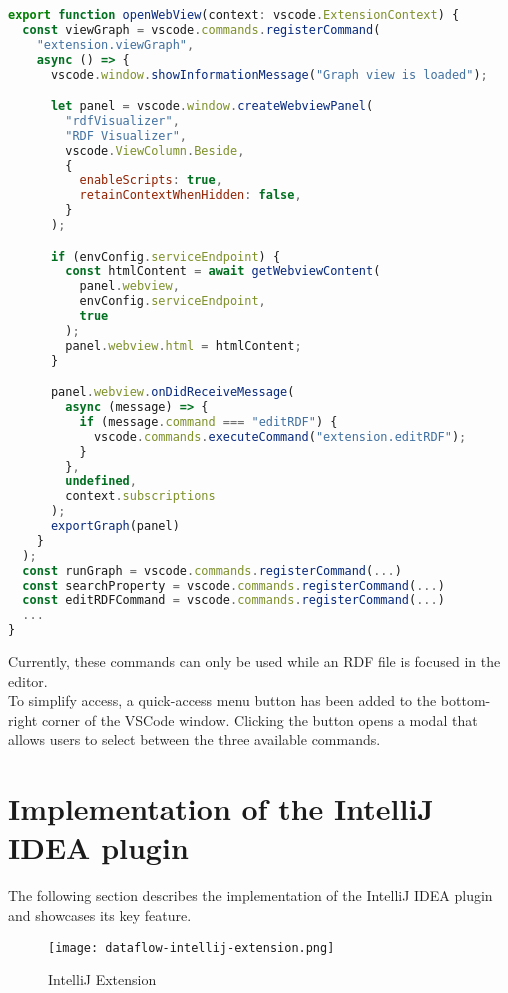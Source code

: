 \begin{lstlisting}[caption={openWebView}, label={lst:open-web-view}, language=JavaScript]
export function openWebView(context: vscode.ExtensionContext) {
  const viewGraph = vscode.commands.registerCommand(
    "extension.viewGraph",
    async () => {
      vscode.window.showInformationMessage("Graph view is loaded");

      let panel = vscode.window.createWebviewPanel(
        "rdfVisualizer",
        "RDF Visualizer",
        vscode.ViewColumn.Beside,
        {
          enableScripts: true,
          retainContextWhenHidden: false,
        }
      );

      if (envConfig.serviceEndpoint) {
        const htmlContent = await getWebviewContent(
          panel.webview,
          envConfig.serviceEndpoint,
          true
        );
        panel.webview.html = htmlContent;
      }

      panel.webview.onDidReceiveMessage(
        async (message) => {
          if (message.command === "editRDF") {
            vscode.commands.executeCommand("extension.editRDF");
          }
        },
        undefined,
        context.subscriptions
      );
      exportGraph(panel)
    }
  );
  const runGraph = vscode.commands.registerCommand(...)
  const searchProperty = vscode.commands.registerCommand(...)
  const editRDFCommand = vscode.commands.registerCommand(...)
  ...
}
\end{lstlisting}

Currently, these commands can only be used while an RDF file is focused in the editor.
\\
To simplify access, a quick-access menu button has been added to the bottom-right corner of the VSCode window. Clicking the button opens a modal that allows users to select between the three available commands.
\section{Implementation of the IntelliJ IDEA plugin}    

The following section describes the implementation of the IntelliJ IDEA plugin and showcases its key feature.

\begin{figure}[htb]
    \centering
    \texttt{[image: dataflow-intellij-extension.png]}
    \caption{IntelliJ Extension}
    \label{fig:intellijextension}
\end{figure}

